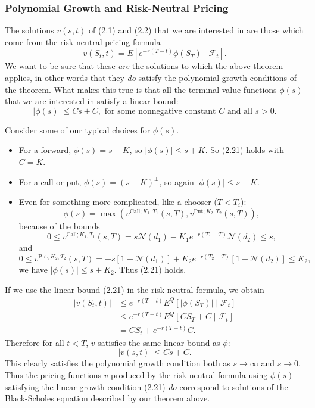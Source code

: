 \subsubsection{Polynomial Growth and Risk-Neutral Pricing}

The solutions \(v(s,t)\) of (2.1) and (2.2) that we are interested in are those which come from the risk neutral pricing formula
\[
v(S_t,t) = E[e^{-r(T-t)} \phi(S_T) \mid \mathcal{F}_t]. \tag{2.20}
\]
We want to be sure that these \textit{are} the solutions to which the above theorem applies, in other words that they \textit{do} satisfy the polynomial growth conditions of the theorem. What makes this true is that all the terminal value functions \(\phi(s)\) that we are interested in satisfy a linear bound:
\[
|\phi(s)| \leq C s + C, \text{ for some nonnegative constant } C \text{ and all } s > 0. \tag{2.21}
\]

Consider some of our typical choices for \(\phi(s)\).

\begin{itemize}
    \item For a forward, \(\phi(s) = s - K\), so \(|\phi(s)| \leq s + K\). So (2.21) holds with \(C = K\).
    \item For a call or put, \(\phi(s) = (s - K)^{\pm}\), so again \(|\phi(s)| \leq s + K\).
    \item Even for something more complicated, like a chooser (\(T < T_i\)):
    \[
    \phi(s) = \max(v^{\text{Call};K_1,T_1}(s,T), v^{\text{Put};K_2,T_2}(s,T)),
    \]
    because of the bounds
    \[
    0 \leq v^{\text{Call};K_1,T_1}(s,T) = s \mathcal{N}(d_1) - K_1 e^{-r(T_1 - T)} \mathcal{N}(d_2) \leq s,
    \]
    and
    \[
    0 \leq v^{\text{Put};K_2,T_2}(s,T) = -s[1 - \mathcal{N}(d_1)] + K_2 e^{-r(T_2 - T)}[1 - \mathcal{N}(d_2)] \leq K_2,
    \]
    we have \(|\phi(s)| \leq s + K_2\). Thus (2.21) holds.
\end{itemize}

If we use the linear bound (2.21) in the risk-neutral formula, we obtain
\begin{align*}
|v(S_t,t)| &\leq e^{-r(T-t)} E^Q[|\phi(S_T)| \mid \mathcal{F}_t] \\
&\leq e^{-r(T-t)} E^Q[C S_T + C \mid \mathcal{F}_t] \\
&= C S_t + e^{-r(T-t)} C.
\end{align*}
Therefore for all \(t < T\), \(v\) satisfies the same linear bound as \(\phi\):
\[
|v(s,t)| \leq C s + C.
\]
This clearly satisfies the polynomial growth condition both as \(s \to \infty\) and \(s \to 0\). Thus the pricing functions \(v\) produced by the risk-neutral formula using \(\phi(s)\) satisfying the linear growth condition (2.21) \textit{do} correspond to solutions of the Black-Scholes equation described by our theorem above.

